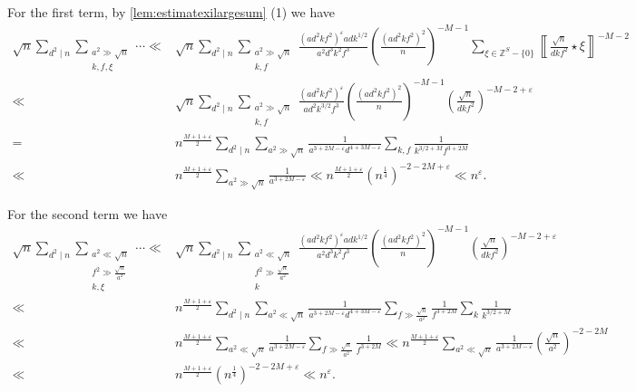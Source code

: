 \documentclass[10pt,oneside,reqno]{amsart}
\makeatletter
\newcommand\ZZ{\mathbb{Z}}
\theoremstyle{THEOREM}
\theoremstyle{DEFINITION}
\theoremstyle{EXERCISE}
\numberwithin{equation}{section}
\renewenvironment{proof}[1][\proofname]{\par
  \vspace{-6pt}
  \pushQED{\qed}
  \normalfont \topsep6\p@\@plus6\p@\relax
  \trivlist
  \item[\hskip\labelsep\rmfamily\bfseries
    #1\@addpunct{:}]\ignorespaces
}{
  \popQED\endtrivlist\@endpefalse
  \vspace{-6pt}
}
\makeatother
\begin{document}
\begin{proof}
For the first term, by \autoref{lem:estimatexilargesum} (1) we have
\begin{align*}
\sqrt{n}\sum_{d^2\mid n}\sum_{\substack{a^2\gg \sqrt {n}\\k,f,\xi}}\cdots%
\ll &\sqrt{n}\sum_{d^2\mid n}\sum_{\substack{a^2\gg \sqrt {n}\\k,f}}\frac{(ad^2kf^2)^\varepsilon adk^{1/2}}{a^2d^3k^2f^3}\left(\frac{(ad^2kf^2)^2}{n} \right)^{-M-1}\sum_{\xi\in \ZZ^S-\{0\}}\left\llbracket\frac{\sqrt{n}}{dkf^2}\star \xi\right\rrbracket^{-M-2} \\
\ll &\sqrt{n}\sum_{d^2\mid n}\sum_{\substack{a^2\gg \sqrt {n}\\k,f}}\frac{(ad^2kf^2)^\varepsilon}{ad^2k^{3/2}f^3}\left(\frac{(ad^2kf^2)^2}{n} \right)^{-M-1}\left(\frac{\sqrt{n}}{dkf^2}\right)^{-M-2+\varepsilon}\\
=&n^{\frac{M+1+\varepsilon}{2}}\sum_{d^2\mid n}\sum_{a^2\gg \sqrt{n}}\frac{1}{a^{3+2M-\varepsilon}d^{4+3M-\varepsilon}}\sum_{k,f}\frac{1}{k^{3/2+M}f^{3+2M}}\\
\ll &n^{\frac{M+1+\varepsilon}{2}}\sum_{a^2\gg \sqrt{n}}\frac{1}{a^{3+2M-\varepsilon}}\ll n^{\frac{M+1+\varepsilon}{2}} (n^{\frac14})^{-2-2M+\varepsilon}\ll n^{\varepsilon}.
\end{align*}

For the second term we have
\begin{align*}
\sqrt{n}\sum_{d^2\mid n}\sum_{\substack{a^2\ll \sqrt {n}\\ f^2\gg \frac{\sqrt{n}}{a^2}\\k,\xi}}\cdots%
\ll&\sqrt{n}\sum_{d^2\mid n}\sum_{\substack{a^2\ll \sqrt {n}\\ f^2\gg \frac{\sqrt{n}}{a^2}\\k}}\frac{(ad^2kf^2)^\varepsilon adk^{1/2}}{a^2d^3k^2f^3}\left(\frac{(ad^2kf^2)^2}{n} \right)^{-M-1}\left(\frac{\sqrt{n}}{dkf^2}\right)^{-M-2+\varepsilon}\\
\ll&n^{\frac{M+1+\varepsilon}{2}}\sum_{d^2\mid n}\sum_{a^2\ll \sqrt{n}}\frac{1}{a^{3+2M-\varepsilon}d^{4+3M-\varepsilon}}\sum_{f\gg \frac{\sqrt{n}}{a^2}}\frac{1}{f^{3+2M}}\sum_{k}\frac{1}{k^{3/2+M}}\\
\ll &n^{\frac{M+1+\varepsilon}{2}}\sum_{a^2\ll \sqrt{n}}\frac{1}{a^{3+2M-\varepsilon}}\sum_{f\gg\frac{\sqrt{n}}{a^2}}\frac{1}{f^{3+2M}}\ll n^{\frac{M+1+\varepsilon}{2}}\sum_{a^2\ll \sqrt{n}}\frac{1}{a^{3+2M-\varepsilon}} \left(\frac{\sqrt{n}}{a^2}\right)^{-2-2M}\\
\ll &n^{\frac{M+1+\varepsilon}{2}}(n^{\frac14})^{-2-2M+\varepsilon}\ll n^{\varepsilon}.
\end{align*}


\end{proof}
\end{document}
